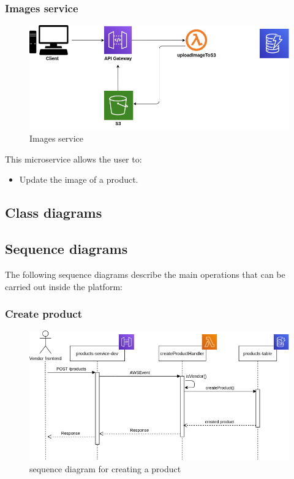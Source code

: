 \subsubsection{Images service}
\begin{figure}[!h]
    \vspace{5px}
    \includegraphics[scale=0.5]{../../../../Images/Diagrammi/maintainerManual/imageService.png}
    \centering
    \caption{Images service}
\end{figure}
This microservice allows the user to:
\begin{itemize}
    \item Update the image of a product.
\end{itemize}

\subsection{Class diagrams}
\subsection{Sequence diagrams}
The following sequence diagrams describe the main operations that can be carried out inside the platform:
\subsubsection{Create product}
\begin{figure}[!h]
    \vspace{5px}
    \includegraphics[scale=0.5]{../../../../Images/Diagrammi/maintainerManual/createProductSequence.png}
    \centering
    \caption{sequence diagram for creating a product} 
\end{figure}
\pagebreak
